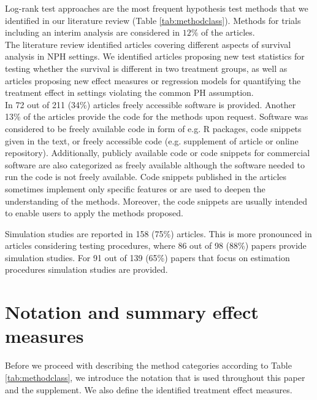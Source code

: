 \documentclass{article}
\begin{document}
\noindent %
Log-rank test approaches are the most frequent hypothesis test methods that we identified in our literature review (Table \ref{tab:methodclass}). Methods for trials including an interim analysis are considered in $12\%$ of the articles.\\
The literature review identified articles covering different aspects of survival analysis in NPH settings. We identified articles proposing new test statistics for testing whether the survival is different in two treatment groups, as well as articles proposing new effect measures or regression models for quantifying the treatment effect in settings violating the common PH assumption.\\
In 72 out of 211 (34\%) articles freely accessible software is provided. Another 13\% of the articles provide the code for the methods upon request.
Software was considered to be freely available code in form of e.g. R packages, code snippets given in the text, or freely accessible code (e.g. supplement of article or online repository). Additionally, publicly available code or code snippets for commercial software are also categorized as freely available although the software needed to run the code is not freely available. Code snippets published in the articles sometimes implement only specific features or are used to deepen the understanding of the methods. Moreover, the code snippets are usually intended to enable users to apply the methods proposed. 

\noindent Simulation studies are reported in 158 (75\%) articles.
This is more pronounced in articles considering testing procedures, where 86 out of 98 (88\%) papers provide simulation studies.
For 91 out of 139  (65\%) papers that focus on estimation procedures simulation studies are provided.




\section{Notation and summary effect measures} \label{classification}

Before we proceed with describing the method categories according to Table \ref{tab:methodclass}, we introduce the notation that is used throughout this paper and the supplement.
We also define the identified treatment effect measures.
\end{document}
